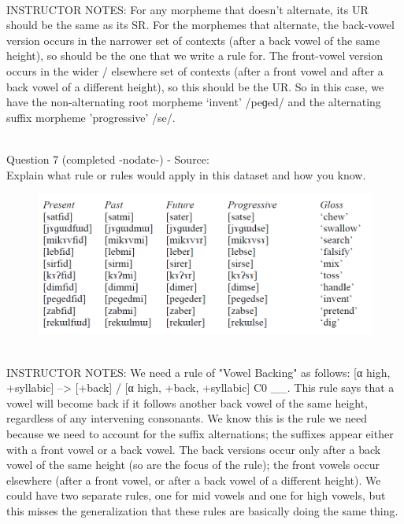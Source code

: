 \documentclass[12pt]{article}
\begin{document}
~\\
INSTRUCTOR NOTES: For any morpheme that doesn’t alternate, its UR should be the same as its SR.  For the morphemes that alternate, the back-vowel version occurs in the narrower set of contexts (after a back vowel of the same height), so should be the one that we write a rule for. The front-vowel version occurs in the wider / elsewhere set of contexts (after a front vowel and after a back vowel of a different height), so this should be the UR. So in this case, we have the non-alternating root morpheme ‘invent’ /peɡed/ and the alternating suffix morpheme 'progressive' /se/.


~\\

{\large Question 7} (completed -nodate-) - Source: \\

Explain what rule or rules would apply in this dataset and how you know.\\

\begin{figure}[H]
\includegraphics{../images/final_dataset.png}
\end{figure}

~\\
INSTRUCTOR NOTES: We need a rule of "Vowel Backing" as follows: [α high, +syllabic] --> [+back] / [α high, +back, +syllabic] C0 \_\_. This rule says that a vowel will become back if it follows another back vowel of the same height, regardless of any intervening consonants. We know this is the rule we need because we need to account for the suffix alternations; the suffixes appear either with a front vowel or a back vowel. The back versions occur only after a back vowel of the same height (so are the focus of the rule); the front vowels occur elsewhere (after a front vowel, or after a back vowel of a different height). We could have two separate rules, one for mid vowels and one for high vowels, but this misses the generalization that these rules are basically doing the same thing.
\end{document}
